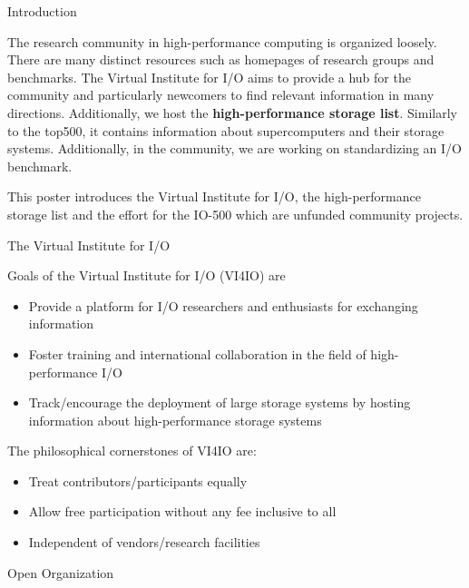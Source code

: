 \documentclass[portrait,a0paper,fontscale=0.4]{baposter}
\newcommand{\compresslist}{%
\setlength{\itemsep}{1pt}%
\setlength{\parskip}{0pt}%
\setlength{\parsep}{0pt}%
}
\begin{document}
\begin{poster}
\begin{posterbox}[name=problem,column=0]
{Introduction}

The research community in high-performance computing is organized loosely.
There are many distinct resources such as homepages of research groups and benchmarks.
The Virtual Institute for I/O aims to provide a hub for the community and particularly newcomers to find relevant information in many directions.
Additionally, we host the \textbf{high-performance storage list}. Similarly to the top500, it contains information about supercomputers and their storage systems.
Additionally, in the community, we are working on standardizing an I/O benchmark.

This poster introduces the Virtual Institute for I/O, the high-performance storage list and the effort for the IO-500 which are unfunded community projects.
\end{posterbox}


\begin{posterbox}[name=approach,column=0,below=problem]
{The Virtual Institute for I/O}


Goals of the Virtual Institute for I/O (VI4IO) are
\vspace*{-1em}
\begin{itemize}\compresslist
\item Provide a platform for I/O researchers and enthusiasts for exchanging information
\item Foster training and international collaboration in the field of high-performance I/O
\item Track/encourage the deployment of large storage systems by hosting information about high-performance storage systems
\end{itemize}
\vspace*{-1em}

The philosophical cornerstones of VI4IO are:

\vspace*{-1em}
\begin{itemize}\compresslist
\item Treat contributors/participants equally
\item Allow free participation without any fee inclusive to all
\item Independent of vendors/research facilities
\end{itemize}
\end{posterbox}


\begin{posterbox}[name=overview,column=0,below=approach]{Open Organization}


\end{posterbox}
\end{poster}
\end{document}
